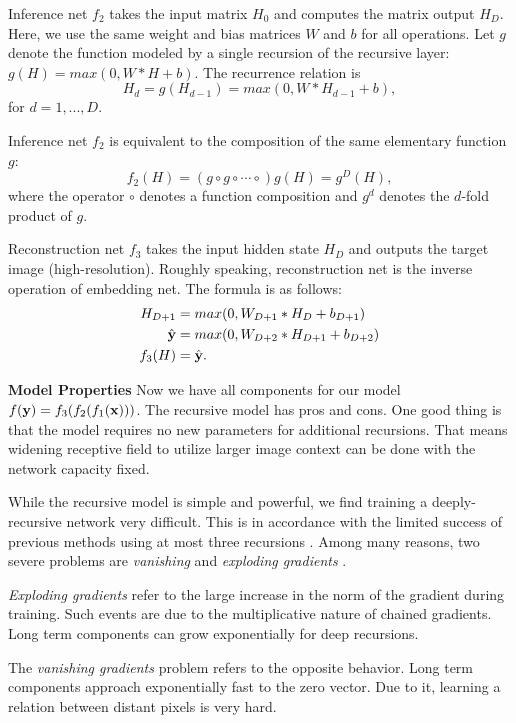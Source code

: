 \documentclass[10pt,twocolumn,letterpaper]{article}
\begin{document}
Inference net $f_2$ takes the input matrix $H_0$ and computes the matrix output $H_{D}$. Here, we use the same weight and bias matrices $W$ and $b$ for all operations.  Let $g$ denote the function modeled by a single recursion of the recursive layer: $g(H)=max(0,W*H+b)$. The recurrence relation is  
\begin{equation}
 H_d = g(H_{d-1}) = max(0,W*H_{d-1}+b),
\end{equation}
for $d = 1, ..., D$. 

Inference net $f_2$ is equivalent to the composition of the same elementary function $g$: 
\begin{equation}
f_2(H) = (g \circ g \circ \cdots \circ) g(H) =  g^{D}(H),
\end{equation}
where the operator $\circ$ denotes a function composition and $g^{d}$ denotes the $d$-fold product of $g$.

Reconstruction net $f_3$ takes the input hidden state $H_D$ and outputs the target image (high-resolution). Roughly speaking, reconstruction net is the inverse operation of embedding net. The formula is as follows:
\begin{align}
	H_{D+1} &= max(0, W_{D+1}*H_D + b_{D+1})\\
	\hat{{\bf y}} &= max(0, W_{D+2}*H_{D+1} + b_{D+2})\\
	f_3(H) &= \hat{{\bf y}}.
\end{align}

\textbf{Model Properties} Now we have all components for our model $f({\bf y}) = f_3(f_2 (f_1({\bf x})))$. The recursive model has pros and cons. One good thing is that the model requires no new parameters for additional recursions. That means widening receptive field to utilize larger image context can be done with the network capacity fixed. 

While the recursive model is simple and powerful, we find training a deeply-recursive network very difficult. This is in accordance with the limited success of previous methods using at most three recursions \cite{Liang_2015_CVPR}.  Among many reasons, two severe problems are \textit{vanishing} and \textit{exploding gradients} \cite{bengio1994learning, pascanu2013difficulty}.  

\textit{Exploding gradients} refer to the large increase in the norm
of the gradient during training. Such events are due to
the multiplicative nature of chained gradients. Long term components can grow exponentially for deep recursions.


The
\textit{vanishing gradients} problem refers to the opposite behavior. Long term components approach exponentially
fast to the zero vector. Due to it, learning a relation between distant pixels is very hard.
\end{document}
